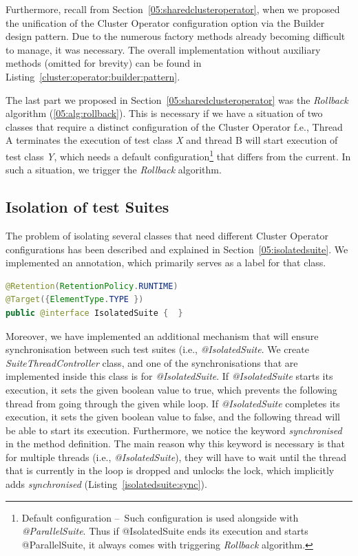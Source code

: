 Furthermore, recall from Section~\ref{05:sharedclusteroperator}, when we proposed the unification of the Cluster Operator configuration
option via the Builder design pattern.
Due to the numerous factory methods already becoming difficult to manage, it was necessary.
The overall implementation without auxiliary methods (omitted for brevity) can be found in Listing~\ref{cluster:operator:builder:pattern}.

The last part we proposed in Section~\ref{05:sharedclusteroperator} was the \emph{Rollback} algorithm (\ref{05:alg:rollback}).
This is necessary if we have a situation of two classes that require a distinct configuration of the Cluster Operator f.e.,
Thread A terminates the execution of test class \emph{X} and thread B will start execution of test class \emph{Y},
which needs a default configuration\footnote{Default configuration \---\ Such configuration is used alongside with \emph{@ParallelSuite}.
Thus if @IsolatedSuite ends its execution and starts @ParallelSuite, it always comes with triggering \emph{Rollback} algorithm.} that differs from the current.
In such a situation, we trigger the \emph {Rollback} algorithm.

\subsection{Isolation of test Suites}
\label{05:sub:sec:isolation:of:test:suites}

The problem of isolating several classes that need different Cluster Operator configurations has been described and explained in Section~\ref{05:isolatedsuite}.
We implemented an annotation, which primarily serves as a label for that class.
\begin{lstlisting}[language=Java,label=annotation:isolatedsuite,caption=Implementation of the @IsolatedSuite annotation,frame=tb]
@Retention(RetentionPolicy.RUNTIME)
@Target({ElementType.TYPE })
public @interface IsolatedSuite {  }
\end{lstlisting}
Moreover, we have implemented an additional mechanism that will ensure synchronisation between such test suites
(i.e., \emph{@IsolatedSuite}. We create \emph{SuiteThreadController} class, and one of the synchronisations that are
implemented inside this class is for \emph {@IsolatedSuite}. If \emph{@IsolatedSuite} starts its execution, it sets the given
boolean value to true, which prevents the following thread from going through the given while loop.
If \emph{@IsolatedSuite} completes its execution, it sets the given boolean value to false, and
the following thread will be able to start its execution. Furthermore, we notice the keyword \emph{synchronised}
in the method definition. The main reason why this keyword is necessary is that for multiple threads (i.e., \emph{@IsolatedSuite}),
they will have to wait until the thread that is currently in the loop is dropped and unlocks the lock, which implicitly
adds \emph {synchronised} (Listing~\ref{isolatedsuite:sync}).

